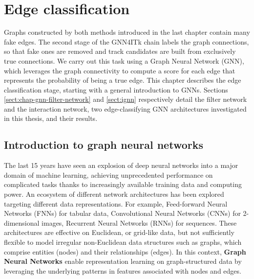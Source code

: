 \chapter{Edge classification}
\label{chap:gnn}

Graphs constructed by both methods introduced in the last chapter contain many fake edges.
The second stage of the GNN4ITk chain labels the graph connections, so that fake ones are removed and track candidates are built from exclusively true connections. 
We carry out this task using a Graph Neural Network (GNN), which leverages the graph connectivity to compute a score for each edge that represents the probability of being a true edge.
This chapter describes the edge classification stage, starting with a general introduction to GNNs.
Sections \ref{sect:chap-gnn-filter-network} and \ref{sect:ignn} respectively detail the filter network and the interaction network, two edge-classifying GNN architectures investigated in this thesis, and their results. 

\section{Introduction to graph neural networks}
\label{sect:chap-gnn-intro-to-graph-network}

The last 15 years have seen an explosion of deep neural networks into a major domain of machine learning, achieving unprecedented performance on complicated tasks thanks to increasingly available training data and computing power. 
An ecosystem of different network architectures has been explored targeting different data representations. 
For example, Feed-forward Neural Networks (FNNs) for tabular data, Convolutional Neural Networks (CNNs) for 2-dimensional images, Recurrent Neural Networks (RNNs) for sequences.
These architectures are effective on Euclidean, or grid-like data, but not sufficiently flexible to model irregular non-Euclidean data structures such as graphs, which comprise entities (nodes) and their relationships (edges). 
In this context, \textbf{Graph Neural Networks} enable representation learning on graph-structured data by leveraging the underlying patterns in features associated with nodes and edges.

